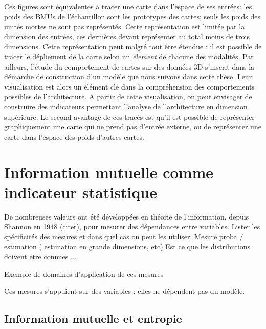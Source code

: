 Ces figures sont équivalentes à tracer une carte dans l'espace de ses entrées: les poids des BMUs de l'échantillon sont les prototypes des cartes; seuls les poids des unités mortes ne sont pas représentés.
Cette représentation est limitée par la dimension des entrées, ces dernières devant représenter au total moins de trois dimensions. Cette représentation peut malgré tout être étendue : il est possible de tracer le dépliement de la carte selon un \emph{élement} de chacune des modalités.
Par ailleurs, l'étude du comportement de cartes sur des données 3D s'inscrit dans la démarche de construction d'un modèle que nous suivons dans cette thèse. Leur visualisation est alors un élément clé dans la compréhension des comportements possibles de l'architecture. A partir de cette visualisation, on peut envisager de construire des indicateurs permettant l'analyse de l'architecture en dimension supérieure. 
Le second avantage de ces tracés est qu'il est possible de représenter graphiquement une carte qui ne prend pas d'entrée externe, ou de représenter une carte dans l'espace des poids d'autres cartes.

\section{Information mutuelle comme indicateur statistique}

De nombreuses valeurs ont été développées en théorie de l'information, depuis Shannon en 1948 (citer), pour mesurer des dépendances entre variables.
Lister les spécificités des mesures et dans quel cas on peut les utiliser: 
Mesure proba / estimation ( estimation en grande dimensions, etc)
Est ce que les distributions doivent etre connues ...

Exemple de domaines d'application de ces mesures

Ces mesures s'appuient sur des variables : elles ne dépendent pas du modèle. 

\subsection{Information mutuelle et entropie}

